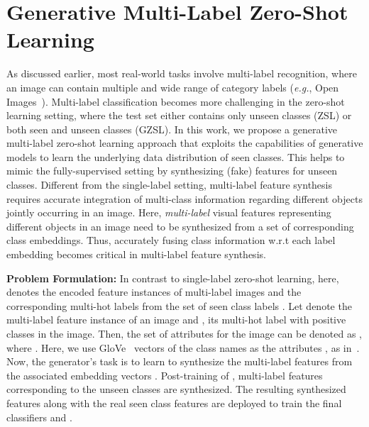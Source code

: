\documentclass[10pt,journal,compsoc]{IEEEtran}
\begin{document}
\section{Generative Multi-Label Zero-Shot Learning\label{sec:method}}





As discussed earlier, most real-world tasks involve multi-label recognition, where an image can contain multiple and wide range of category labels (\textit{e.g.}, Open Images~\cite{openimages}). Multi-label classification becomes more challenging in the zero-shot learning setting, where the test set either contains only unseen classes (ZSL) or both seen and unseen classes (GZSL). 
In this work, we propose a generative multi-label zero-shot learning approach that exploits the capabilities of generative models to learn the underlying data distribution of seen classes. This helps to mimic the fully-supervised setting by synthesizing (fake) features for unseen classes. 
Different from the single-label setting, multi-label feature synthesis requires accurate integration of multi-class information regarding different objects jointly occurring in an image. Here, \textit{multi-label} visual features representing different objects in an image need to be synthesized from a set of corresponding class embeddings. Thus, accurately fusing class information w.r.t each label embedding becomes critical in multi-label feature synthesis.












\noindent\textbf{Problem Formulation:} 
In contrast to single-label zero-shot learning, here,  denotes the encoded feature instances of multi-label images and  the corresponding multi-hot labels from the set of  seen class labels . Let  denote the multi-label feature instance of an image and , its multi-hot label with  positive classes in the image. Then, the set of attributes for the image can be denoted as , where . Here, we use GloVe~\cite{pennington2014glove} vectors of the class names as the attributes , as in~\cite{huynh2020shared}.
Now, the generator's task is to learn to synthesize the multi-label features  from the associated embedding vectors .
Post-training of , multi-label features corresponding to the unseen classes are synthesized. The resulting synthesized features along with the real seen class features are deployed to train the final classifiers  and . 
\end{document}
